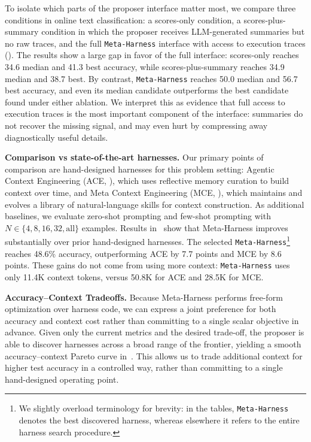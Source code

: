 \documentclass{article}
\newcommand{\ours}[1]{\texttt{#1}}
\begin{document}


To isolate which parts of the proposer interface matter most, we compare three conditions in online text classification: a scores-only condition, a scores-plus-summary condition in which the proposer receives LLM-generated summaries but no raw traces, and the full \ours{Meta-Harness} interface with access to execution traces (). The results show a large gap in favor of the full interface: scores-only reaches 34.6 median and 41.3 best accuracy, while scores-plus-summary reaches 34.9 median and 38.7 best. By contrast, \ours{Meta-Harness} reaches 50.0 median and 56.7 best accuracy, and even its median candidate outperforms the best candidate found under either ablation. We interpret this as evidence that full access to execution traces is the most important component of the interface: summaries do not recover the missing signal, and may even hurt by compressing away diagnostically useful details.




\textbf{Comparison vs state-of-the-art harnesses.}
Our primary points of comparison are hand-designed harnesses for this problem setting: Agentic Context Engineering (ACE, \citet{zhang2025ace}), which uses reflective memory curation to build context over time, and Meta Context Engineering (MCE, \citet{ye2026meta}), which maintains and evolves a library of natural-language skills for context construction.
As additional baselines, we evaluate zero-shot prompting and few-shot prompting with $N \in \{4, 8, 16, 32, \text{all}\}$ examples.
Results in~ show that Meta-Harness improves substantially over prior hand-designed harnesses.
The selected \ours{Meta-Harness}\footnote{We slightly overload terminology for brevity: in the tables, \ours{Meta-Harness} denotes the best discovered harness, whereas elsewhere it refers to the entire harness search procedure.} reaches 48.6\% accuracy, outperforming ACE by 7.7 points and MCE by 8.6 points.
These gains do not come from using more context: \ours{Meta-Harness} uses only 11.4K context tokens, versus 50.8K for ACE and 28.5K for MCE.

\textbf{Accuracy--Context Tradeoffs.}
Because Meta-Harness performs free-form optimization over harness code, we can express a joint preference for both accuracy and context cost rather than committing to a single scalar objective in advance.
Given only the current metrics and the desired trade-off, the proposer is able to discover harnesses across a broad range of the frontier, yielding a smooth accuracy--context Pareto curve in~.
This allows us to trade additional context for higher test accuracy in a controlled way, rather than committing to a single hand-designed operating point.
\end{document}
